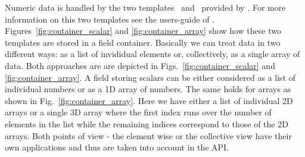 Numeric data is handled by the two templates \arrayt\ and \scalart\  
provided by \pniutils. For more information on this two templates see 
the users-guide of \pniutils.
Figures~\ref{fig:container_scalar} and \ref{fig:container_array} show how these 
two templates are stored in a field container. 
Basically we can treat data in two different ways: as a list of invididual
elements or, collectively, as a single array of data. 
Both approaches are are depicted in Figs.~\ref{fig:container_scalar} and 
\ref{fig:container_array}. A field storing scalars can be either considered 
as a list of individual numbers or as a 1D array of numbers. 
The same holds for arrays as shown in Fig.~\ref{fig:container_array}. Here 
we have either a list of individual 2D arrays or a single 3D array where the 
first index runs over the number of elements in the list while the remaining 
indices correspond to those of the 2D arrays.
Both points of view - the element wise or the collective view have their own 
applications and thus are taken into account in the API. 

